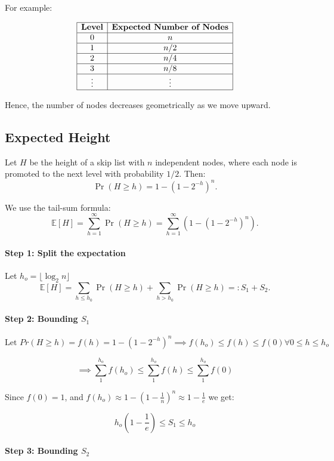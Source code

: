 \documentclass[11pt,openany]{book}
\begin{document}
For example:

\[
\begin{array}{|c|c|}
\hline
\textbf{Level} & \textbf{Expected Number of Nodes} \\
\hline
0 & n \\
\hline
1 & n/2\\
\hline
2 & n/4 \\
\hline
3 & n/8 \\
\hline
\vdots & \vdots \\
\hline
\end{array}
\]

Hence, the number of nodes decreases geometrically as we move upward.

\subsection[Expected Height of Skip List]{Expected Height}

Let \(H\) be the height of a skip list with \(n\) independent nodes, where each node is promoted to the next level with probability \(1/2\). Then:
\[
\Pr(H\ge h)=1-(1-2^{-h})^n.
\]

We use the tail-sum formula:
\[
\mathbb{E}[H]=\sum_{h=1}^{\infty}\Pr(H\ge h)
=\sum_{h=1}^{\infty}\left(1-(1-2^{-h})^n\right).
\]


\paragraph{Step 1: Split the expectation}


Let $h_o=\lfloor \log_2 n \rfloor$
\[
\mathbb{E}[H]
=\sum_{h\le h_0}\Pr(H\ge h)
+\sum_{h>h_0}\Pr(H\ge h)
=:S_1+S_2.
\]


\paragraph{Step 2: Bounding \(S_1\)}

\[
\text{Let } Pr(H\ge h)=f(h)=1-(1-2^{-h})^{n}
\implies 
f(h_{o}) \le f(h) \le f(0) \forall 0 \le h \le h_o
\]

\[
\implies 
\sum_1^{h_o}f(h_{o}) \le \sum_1^{h_o}f(h) \le \sum_1^{h_o}f(0)
\]

Since $f(0)=1$, and $f(h_o) \approx 1-(1-\frac{1}{n})^n \approx 1-\frac{1}{e}$ we get:

\[
h_o(1-\frac{1}{e})\le S_1 \le h_o
\]

\paragraph{Step 3: Bounding \(S_2\)}
\end{document}
